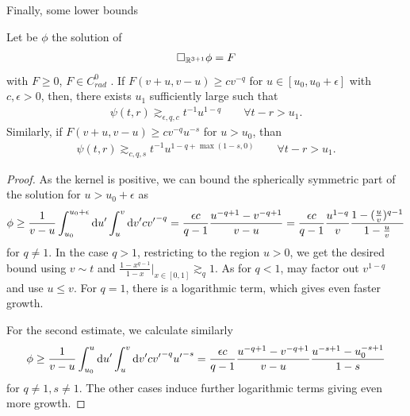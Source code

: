 \documentclass[11pt, oneside]{amsart}
\begin{document}
	Finally, some lower bounds
	\begin{lemma}\label{lower bound}
		Let be $\phi$ the solution of
		\begin{equation*}
			\begin{gathered}
				\Box_{\mathbb{R}^{3+1}}\phi=F
			\end{gathered}
		\end{equation*}
		 with $F\geq0$, $F\in C_{rad}^0$ . If $F(v+u,v-u)\geq c v^{-q}$ for $u\in[u_0,u_0+\epsilon]$ with $c,\epsilon>0$, then, there exists $u_1$ sufficiently large such that
		\begin{equation*}
			\begin{gathered}
				\psi(t,r)\gtrsim_{\epsilon,q,c} t^{-1}u^{1-q}\qquad \forall t-r>u_1.
			\end{gathered}
		\end{equation*}
		Similarly, if $F(v+u,v-u)\geq c v^{-q}u^{-s}$ for $u>u_0$, than
		\begin{equation*}
			\begin{gathered}
				\psi(t,r)\gtrsim_{c,q,s} t^{-1}u^{1-q+\max(1-s,0)}\qquad \forall t-r>u_1.
			\end{gathered}
		\end{equation*}
	\end{lemma}
	\begin{proof}
		As the kernel is positive, we can bound the spherically symmetric part of the solution for $u>u_0+\epsilon$ as
		\begin{equation*}
			\begin{gathered}
				\phi\geq\frac{1}{v-u}\int_{u_0}^{u_0+\epsilon}\mathrm{d} u'\int_u^v\mathrm{d} v' c{v'}^{-q}=\frac{\epsilon c}{q-1}\frac{u^{-q+1}-v^{-q+1}}{v-u}=\frac{\epsilon c}{q-1}\frac{u^{1-q}}{v}\frac{1-(\frac{u}{v})^{q-1}}{1-\frac{u}{v}}
			\end{gathered}
		\end{equation*}
		for $q\neq1$. In the case $q>1$, restricting to the region $u>0$, we get the desired bound using $v\sim t$ and $\frac{1-x^{q-1}}{1-x}|_{x\in[0,1]}\gtrsim_q1$. As for $q<1$, may factor out $v^{1-q}$ and use $u\leq v$. For $q=1$, there is a logarithmic term, which gives even faster growth. 
		
		For the second estimate, we calculate similarly
		\begin{equation*}
			\begin{gathered}
				\phi\geq\frac{1}{v-u}\int_{u_0}^{u}\mathrm{d} u'\int_u^v\mathrm{d} v' c{v'}^{-q}{u'}^{-s}=\frac{\epsilon c}{q-1}\frac{u^{-q+1}-v^{-q+1}}{v-u}\frac{u^{-s+1}-u_0^{-s+1}}{1-s}
			\end{gathered}
		\end{equation*}
		for $q\neq1,s\neq1$. The other cases induce further logarithmic terms giving even more growth.
	\end{proof}
	
\end{document}
